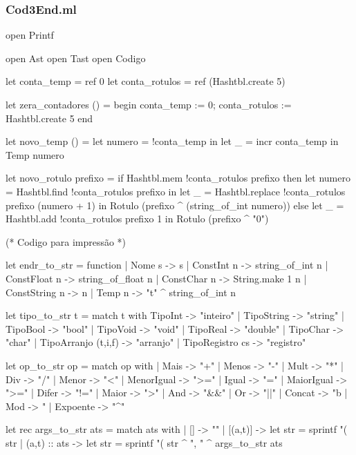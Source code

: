\documentclass[12pt,a4paper,twoside]{article}
\begin{document}
\subsubsection{Cod3End.ml}
\begin{terminal}
open Printf

open Ast
open Tast
open Codigo

let conta_temp = ref 0
let conta_rotulos = ref (Hashtbl.create 5)

let zera_contadores () =
  begin
    conta_temp := 0;
    conta_rotulos := Hashtbl.create 5
  end
  
let novo_temp () =
   let numero = !conta_temp in
   let _ = incr conta_temp in
   Temp numero
   
let novo_rotulo prefixo =
  if Hashtbl.mem !conta_rotulos prefixo
  then
     let numero = Hashtbl.find !conta_rotulos prefixo in
     let _ = Hashtbl.replace !conta_rotulos prefixo (numero + 1) in
     Rotulo (prefixo ^ (string_of_int numero))     
  else
     let _ = Hashtbl.add !conta_rotulos prefixo 1 in
     Rotulo (prefixo ^ "0")

(* Codigo para impressão *)

let endr_to_str = function
   | Nome s -> s
   | ConstInt n -> string_of_int n
   | ConstFloat n -> string_of_float n
   | ConstChar n -> String.make 1 n
   | ConstString n -> n
   | Temp n  -> "t" ^ string_of_int n

let tipo_to_str t =
    match t with
      TipoInt -> "inteiro"
    | TipoString -> "string"
    | TipoBool -> "bool"
    | TipoVoid -> "void"
    | TipoReal -> "double"
    | TipoChar -> "char"
    | TipoArranjo (t,i,f) -> "arranjo"
    | TipoRegistro cs -> "registro"


let op_to_str op = 
  match op with
  | Mais  -> "+"
  | Menos -> "-"
  | Mult  -> "*"
  | Div   -> "/"
  | Menor -> "<"
  | MenorIgual -> ">="
  | Igual -> "="
  | MaiorIgual -> ">="
  | Difer -> "!="
  | Maior -> ">"
  | And     -> "&&"
  | Or    -> "||"
  | Concat -> "^^"
  | Mod -> "%
  | Expoente -> "^"

let rec args_to_str ats =
   match ats with
   | [] -> ""
   | [(a,t)] -> 
     let str = sprintf "(%
     str
   | (a,t) :: ats -> 
     let str = sprintf "(%
     str ^ ", " ^ args_to_str ats
  

\end{terminal}
\end{document}
